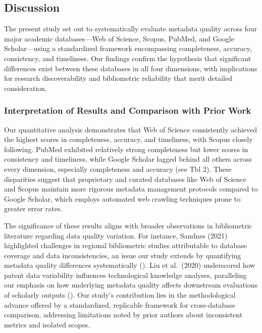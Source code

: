 \documentclass[
  12pt,
]{article}
\begin{document}
\subsection{Discussion}\label{discussion-1}

The present study set out to systematically evaluate metadata quality
across four major academic databases---Web of Science, Scopus, PubMed,
and Google Scholar---using a standardized framework encompassing
completeness, accuracy, consistency, and timeliness. Our findings
confirm the hypothesis that significant differences exist between these
databases in all four dimensions, with implications for research
discoverability and bibliometric reliability that merit detailed
consideration.

\subsubsection{Interpretation of Results and Comparison with Prior
Work}\label{interpretation-of-results-and-comparison-with-prior-work}

Our quantitative analysis demonstrates that Web of Science consistently
achieved the highest scores in completeness, accuracy, and timeliness,
with Scopus closely following. PubMed exhibited relatively strong
completeness but lower scores in consistency and timeliness, while
Google Scholar lagged behind all others across every dimension,
especially completeness and accuracy (see Tbl 2). These disparities
suggest that proprietary and curated databases like Web of Science and
Scopus maintain more rigorous metadata management protocols compared to
Google Scholar, which employs automated web crawling techniques prone to
greater error rates.

The significance of these results aligns with broader observations in
bibliometric literature regarding data quality variation. For instance,
Sandnes (2021) highlighted challenges in regional bibliometric studies
attributable to database coverage and data inconsistencies, an issue our
study extends by quantifying metadata quality differences systematically
(). Liu et al.~(2020)
underscored how patent data variability influences technological
knowledge analyses, paralleling our emphasis on how underlying metadata
quality affects downstream evaluations of scholarly outputs
(). Our study's contribution lies
in the methodological advance offered by a standardized, replicable
framework for cross-database comparison, addressing limitations noted by
prior authors about inconsistent metrics and isolated scopes.
\end{document}
